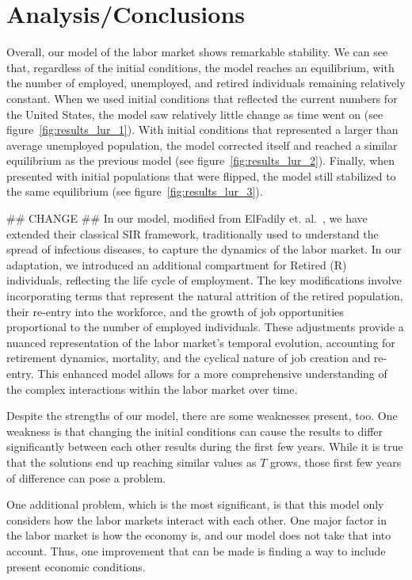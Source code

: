 \documentclass[11pt]{amsart}
\begin{document}
\section{Analysis/Conclusions}

Overall, our model of the labor market shows remarkable stability. 
We can see that, regardless of the initial conditions, the model reaches an equilibrium, 
with the number of employed, unemployed, and retired individuals remaining relatively constant.
When we used initial conditions that reflected the current numbers for the United States,
the model saw relatively little change as time went on (see figure~\ref{fig:results_lur_1}).
With initial conditions that represented a larger than average unemployed population, the model corrected itself and reached a
similar equilibrium as the previous model (see figure~\ref{fig:results_lur_2}).
Finally, when presented with initial populations that were flipped, the model still stabilized to the same equilibrium
(see figure~\ref{fig:results_lur_3}).

## CHANGE ##
In our model, modified from ElFadily et. al.~\cite{ElFadily}, we have extended their classical SIR framework, traditionally 
used to understand the spread of infectious diseases, to capture the dynamics of the labor market. In our adaptation, 
we introduced an additional compartment for Retired (R) individuals, reflecting the life cycle of employment. The key 
modifications involve incorporating terms that represent the natural attrition of the retired population, their re-entry into 
the workforce, and the growth of job opportunities proportional to the number of employed individuals. These adjustments provide 
a nuanced representation of the labor market's temporal evolution, accounting for retirement dynamics, mortality, and the cyclical 
nature of job creation and re-entry. This enhanced model allows for a more comprehensive understanding of the complex interactions 
within the labor market over time.

Despite the strengths of our model, there are some weaknesses present, too. One weakness is that
changing the initial conditions can cause the results to differ significantly between each other results during the first few years.
While it is true that the solutions end up reaching similar values as $T$ grows, those first few years of difference can pose a problem.

One additional problem, which is the most significant, is that this model only considers how the labor markets interact
with each other. One major factor in the labor market is how the economy is, and our model does not take that into account.
Thus, one improvement that can be made is finding a way to include present economic conditions.
\end{document}
